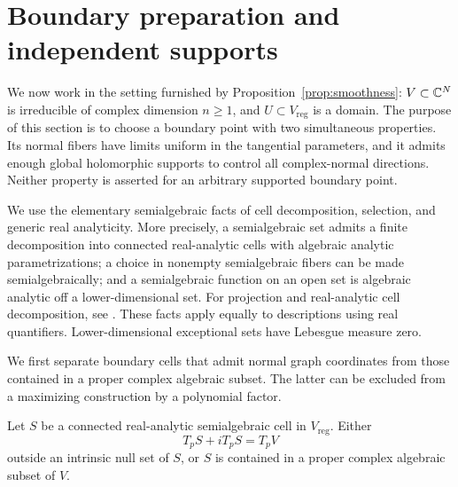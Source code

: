 \section{Boundary preparation and independent supports}
\label{sec:preparation}

We now work in the setting furnished by Proposition~\ref{prop:smoothness}:
$V\subset\mathbb C^N$ is irreducible of complex dimension $n\geq1$, and
$U\subset V_{\mathrm{reg}}$ is a domain.  The purpose of this section is
to choose a boundary point with two simultaneous properties.  Its normal
fibers have limits uniform in the tangential parameters, and it admits
enough global holomorphic supports to control all complex-normal directions.
Neither property is asserted for an arbitrary supported boundary point.

We use the elementary semialgebraic facts of cell decomposition, selection,
and generic real analyticity.  More precisely, a semialgebraic set admits
a finite decomposition into connected real-analytic cells with algebraic
analytic parametrizations; a choice in nonempty semialgebraic fibers can
be made semialgebraically; and a semialgebraic function on an open set is
algebraic analytic off a lower-dimensional set.  For projection and
real-analytic cell decomposition, see
\cite[Sections~1.1--1.2]{Coste2005}.  These facts apply equally
to descriptions using real quantifiers.  Lower-dimensional exceptional
sets have Lebesgue measure zero.

We first separate boundary cells that admit normal graph coordinates
from those contained in a proper complex algebraic subset.  The latter
can be excluded from a maximizing construction by a polynomial factor.

\begin{lemma}
\label{lem:rank-dichotomy}
Let $S$ be a connected real-analytic semialgebraic cell in
$V_{\mathrm{reg}}$.  Either
\begin{equation}
 T_pS+iT_pS=T_pV
 \label{eq:generic-cell}
\end{equation}
outside an intrinsic null set of $S$, or $S$ is contained in a proper
complex algebraic subset of $V$.
\end{lemma}


